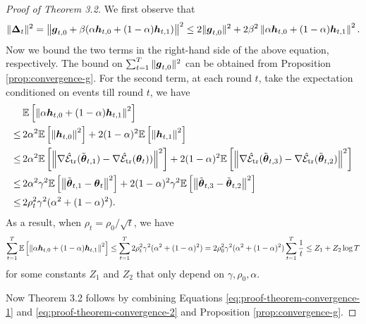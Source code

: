 \begin{proof}[Proof of Theorem 3.2]
    We first observe that
    \begin{equation} \label{eq:proof-theorem-convergence-1}
        \|\boldsymbol{\Delta}_t\|^2 = \left\|\boldsymbol{g}_{t,0}+\beta(\alpha \boldsymbol{h}_{t,0} + (1-\alpha)\boldsymbol{h}_{t,1})\right\|^2 \le 2 \|\boldsymbol{g}_{t,0}\|^2 + 2 \beta^2\left\|\alpha \boldsymbol{h}_{t,0} + (1-\alpha)\boldsymbol{h}_{t,1}\right\|^2.
    \end{equation}
    Now we bound the two terms in the right-hand side of the above equation, respectively. The bound on $\sum_{t=1}^T \|\boldsymbol{g}_{t,0}\|^2$ can be obtained from Proposition \ref{prop:convergence-g}. For the second term, at each round $t$, take the expectation conditioned on events till round $t$, we have 
    \begin{equation}
        \begin{aligned}
            & \, \mathbb{E}\left[\left\|\alpha \boldsymbol{h}_{t,0} + (1-\alpha)\boldsymbol{h}_{t,1}\right\|^2\right] \\
            \le & \, 2\alpha^2\mathbb{E}\left[\left\|\boldsymbol{h}_{t,0}\right\|^2\right] + 2(1-\alpha)^2\mathbb{E}\left[\left\|\boldsymbol{h}_{t,1}\right\|^2\right] \\
            \le & \, 2\alpha^2\mathbb{E}\left[\left\|\nabla \hat{\mathcal{E}}_{{\text{tr}}}(\tilde{\boldsymbol{\theta}}_{t,1}) - \nabla \hat{\mathcal{E}}_{{\text{tr}}}(\boldsymbol{\theta}_t))\right\|^2\right] + 2(1-\alpha)^2\mathbb{E}\left[\left\|\nabla \hat{\mathcal{E}}_{{\text{tr}}}(\tilde{\boldsymbol{\theta}}_{t,3})-\nabla \hat{\mathcal{E}}_{{\text{tr}}}(\tilde{\boldsymbol{\theta}}_{t,2})\right\|^2\right] \\
            \le & \, 2\alpha^2\gamma^2\mathbb{E}\left[\left\|\tilde{\boldsymbol{\theta}}_{t,1} - \boldsymbol{\theta}_t\right\|^2\right] + 2(1-\alpha)^2\gamma^2\mathbb{E}\left[\left\|\tilde{\boldsymbol{\theta}}_{t,3}-\tilde{\boldsymbol{\theta}}_{t,2}\right\|^2\right] \\
            \le & \, 2\rho_t^2\gamma^2(\alpha^2 + (1-\alpha)^2).
        \end{aligned}
    \end{equation}
    As a result, when $\rho_t = \rho_0 / \sqrt{t}$,
    we have
    \begin{equation} \label{eq:proof-theorem-convergence-2}
        \sum_{t=1}^T \mathbb{E}\left[\left\|\alpha \boldsymbol{h}_{t,0} + (1-\alpha)\boldsymbol{h}_{t,1}\right\|^2\right] \le \sum_{t=1}^T 2\rho_t^2\gamma^2(\alpha^2 + (1-\alpha)^2) = 2\rho_0^2\gamma^2(\alpha^2 + (1-\alpha)^2)\sum_{t=1}^T \frac{1}{t} \le Z_1 + Z_2 \log T
    \end{equation}
    for some constants $Z_1$ and $Z_2$ that only depend on $\gamma, \rho_0, \alpha$.

    Now Theorem 3.2 follows by combining Equations \eqref{eq:proof-theorem-convergence-1} and \eqref{eq:proof-theorem-convergence-2} and Proposition \ref{prop:convergence-g}.
\end{proof}